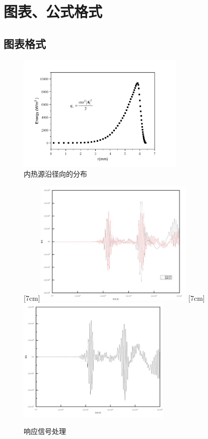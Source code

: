 
\chapter{图表、公式格式}

\section{图表格式}
\begin{figure}[!htp]
  \centering
  \includegraphics[width=8cm]{figures/energy.png} 
  \caption{内热源沿径向的分布}
  \label{fig:energy}
\end{figure}

\begin{figure}[!hbtp]
  \centering
                [7cm]{\includegraphics[height=6cm]{figures/signal_1.png}}
  \hspace{1cm}
                [7cm]{\includegraphics[height=6cm]{figures/signal_2.png}}
  \caption{响应信号处理}
  \label{fig:bisubcaptionbox}
\end{figure}

